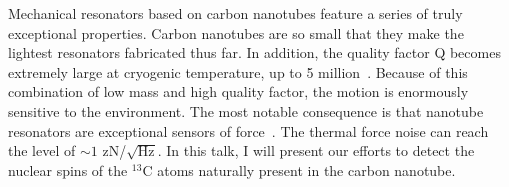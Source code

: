 Mechanical resonators based on carbon nanotubes feature a series of truly exceptional properties. Carbon nanotubes are so small that they make the lightest resonators fabricated thus far. In addition, the quality factor Q becomes extremely large at cryogenic temperature, up to 5 million~\cite{G_ttinger_2017}. Because of this combination of low mass and high quality factor, the motion is enormously sensitive to the environment. The most notable consequence is that nanotube resonators are exceptional sensors of force~\cite{G_ttinger_2017}. The thermal force noise can reach the level of $\sim 1$ zN/$\sqrt{\text{Hz}}$. In this talk, I will present our efforts to detect the nuclear spins of the $^{13}$C atoms naturally present in the carbon nanotube.
